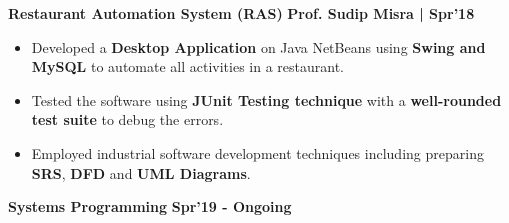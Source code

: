 \documentclass[10pt]{article}
\begin{document}
\vspace{-0.5ex}
\large {\textbf{Restaurant Automation System (RAS)}} \normalsize \href{https://github.com/shmundhra/Restaurant-Automation-System} {\hspace{0.5ex}\faGithub} {\hfill} \textbf{Prof. Sudip Misra | Spr'18}\\[-1.75em]
\begin{itemize}
    \item Developed a \textbf{Desktop Application} on Java NetBeans using \textbf{Swing and MySQL} to automate all activities in a restaurant.\\[-1.9em]
    \item Tested the software using \textbf{JUnit Testing technique} with a \textbf{well-rounded test suite} to debug the errors.  \\[-1.9em] \item Employed industrial software development techniques including preparing \textbf{SRS}, \textbf{DFD} and \textbf{UML Diagrams}. 
    \\[-1em]
\end{itemize}
\vspace{-0.5ex}
\large {\textbf{Systems Programming}} \normalsize \href{https://github.com/shmundhra/Systems-Programming}{\faGithub} {\hfill}\textbf{Spr'19 - Ongoing}\\[-1.8em]
\end{document}
